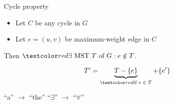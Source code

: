 
\begin{frame}{}
  \centerline{}
\end{frame}

\begin{frame}{}
  \begin{block}{Cycle property }
    \begin{itemize}
      \item Let $C$ be any cycle in $G$
      \item Let $e = (u,v)$ be  maximum-weight edge in $C$
    \end{itemize}

    \centerline{Then $\red{\exists} \text{ MST } T \text{ of } G: e \notin T$.}
  \end{block}


  \pause
  \vspace{-0.30cm}
  \[
    T' = \underbrace{T - \set{e}}_{\red{\text{if } e \;\in\; T}} + \set{e'}
  \]

  \pause
  \centerline{``a'' $\to$ ``the'' \red{$\implies$} ``$\exists$'' $\to$ ``$\forall$''}
\end{frame}


